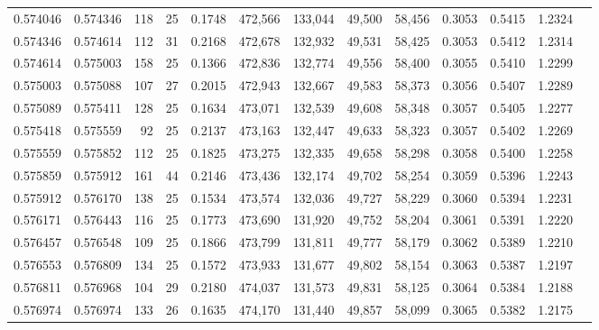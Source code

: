\begin{tabular}{rrrrrrrrrrrrr}
0.574046 & 0.574346 &   118 &  25 &                                     0.1748 & 472,566 & 133,044 &  49,500 &  58,456 & 0.3053 & 0.5415 & 1.2324 \\
0.574346 & 0.574614 &   112 &  31 &                                     0.2168 & 472,678 & 132,932 &  49,531 &  58,425 & 0.3053 & 0.5412 & 1.2314 \\
0.574614 & 0.575003 &   158 &  25 &                                     0.1366 & 472,836 & 132,774 &  49,556 &  58,400 & 0.3055 & 0.5410 & 1.2299 \\
0.575003 & 0.575088 &   107 &  27 &                                     0.2015 & 472,943 & 132,667 &  49,583 &  58,373 & 0.3056 & 0.5407 & 1.2289 \\
0.575089 & 0.575411 &   128 &  25 &                                     0.1634 & 473,071 & 132,539 &  49,608 &  58,348 & 0.3057 & 0.5405 & 1.2277 \\
0.575418 & 0.575559 &    92 &  25 &                                     0.2137 & 473,163 & 132,447 &  49,633 &  58,323 & 0.3057 & 0.5402 & 1.2269 \\
0.575559 & 0.575852 &   112 &  25 &                                     0.1825 & 473,275 & 132,335 &  49,658 &  58,298 & 0.3058 & 0.5400 & 1.2258 \\
0.575859 & 0.575912 &   161 &  44 &                                     0.2146 & 473,436 & 132,174 &  49,702 &  58,254 & 0.3059 & 0.5396 & 1.2243 \\
0.575912 & 0.576170 &   138 &  25 &                                     0.1534 & 473,574 & 132,036 &  49,727 &  58,229 & 0.3060 & 0.5394 & 1.2231 \\
0.576171 & 0.576443 &   116 &  25 &                                     0.1773 & 473,690 & 131,920 &  49,752 &  58,204 & 0.3061 & 0.5391 & 1.2220 \\
0.576457 & 0.576548 &   109 &  25 &                                     0.1866 & 473,799 & 131,811 &  49,777 &  58,179 & 0.3062 & 0.5389 & 1.2210 \\
0.576553 & 0.576809 &   134 &  25 &                                     0.1572 & 473,933 & 131,677 &  49,802 &  58,154 & 0.3063 & 0.5387 & 1.2197 \\
0.576811 & 0.576968 &   104 &  29 &                                     0.2180 & 474,037 & 131,573 &  49,831 &  58,125 & 0.3064 & 0.5384 & 1.2188 \\
0.576974 & 0.576974 &   133 &  26 &                                     0.1635 & 474,170 & 131,440 &  49,857 &  58,099 & 0.3065 & 0.5382 & 1.2175 \\

\end{tabular}
